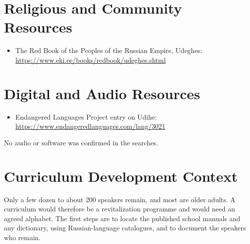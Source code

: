 \documentclass[12pt]{article}
\begin{document}
\section{Religious and Community Resources}
\begin{itemize}
\item The Red Book of the Peoples of the Russian Empire, Udeghes: \url{https://www.eki.ee/books/redbook/udeghes.shtml}
\end{itemize}

\section{Digital and Audio Resources}
\begin{itemize}
\item Endangered Languages Project entry on Udihe: \url{https://www.endangeredlanguages.com/lang/3021}
\end{itemize}
No audio or software was confirmed in the searches.

\section{Curriculum Development Context}
Only a few dozen to about 200 speakers remain, and most are older adults. A curriculum would therefore be a revitalization programme and would need an agreed alphabet. The first steps are to locate the published school manuals and any dictionary, using Russian-language catalogues, and to document the speakers who remain.
\end{document}
